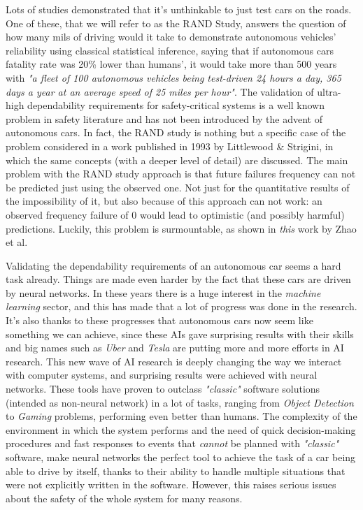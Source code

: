 Lots of studies demonstrated that it's unthinkable to just test cars on the roads. One of these, that we will refer to as the RAND Study, answers the question of how many mils of driving would it take to demonstrate autonomous vehicles' reliability using classical statistical inference, saying that if autonomous cars fatality rate was 20\% lower than humans', it would take more than 500 years with \textsl{"a fleet of 100 autonomous vehicles being test-driven 24 hours a day, 365 days a year at an average speed of 25 miles per hour"}.\cite{randstudy}\newline
The validation of ultra-high dependability requirements for safety-critical systems is a well known problem in safety literature and has not been introduced by the advent of autonomous cars. In fact, the RAND study is nothing but a specific case of the problem considered in a work published in 1993 by Littlewood \& Strigini, in which the same concepts (with a deeper level of detail) are discussed.\cite{littlewoodStrigini}\newline
The main problem with the RAND study approach is that future failures frequency can not be predicted just using the observed one. Not just for the quantitative results of the impossibility of it, but also because of this approach can not work: an observed frequency failure of 0 would lead to optimistic (and possibly harmful) predictions. Luckily, this problem is surmountable, as shown in \textsl{this}\cite{zhaoStrigini} work by Zhao et al.\newline

Validating the dependability requirements of an autonomous car seems a hard task already. Things are made even harder by the fact that these cars are driven by neural networks.\newline
In these years there is a huge interest in the \textsl{machine learning} sector, and this has made that a lot of progress was done in the research. It's also thanks to these progresses that autonomous cars now seem like something we can achieve, since these AIs gave surprising results with their skills and big names such as \textsl{Uber} and \textsl{Tesla} are putting more and more efforts in AI research.
This new wave of AI research is deeply changing the way we interact with computer systems, and surprising results were achieved with neural networks.\newline
These tools have proven to outclass \textsl{"classic"} software solutions (intended as non-neural network) in a lot of tasks, ranging from \textsl{Object Detection}\cite{retinaNet} to \textsl{Gaming}\cite{alphaGo} problems, performing even better than humans.\cite{alphaGoBeatsMan}
The complexity of the environment in which the system performs and the need of quick decision-making procedures and fast responses to events that \textsl{cannot} be planned with \textsl{"classic"} software, make neural networks the perfect tool to achieve the task of a car being able to drive by itself, thanks to their ability to handle multiple situations that were not explicitly written in the software. However, this raises serious issues about the safety of the whole system for many reasons.\newline

